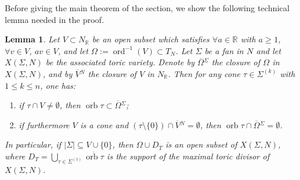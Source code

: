 \documentclass[JEP,XML,SOM,Unicode,NoFloatCountersInSection]{cedram}
\newenvironment{enumeratei}
{\bgroup\def\theenumi{\roman{enumi}}\def\theenumii{\arabic{enumii}}\begin{enumerate}}
{\end{enumerate}\egroup}
\newtheorem{lemma}[theorem]{Lemma}
\theoremstyle{definition}
\let\ov\overline
\let\sminus\setminus
\newcommand{\RR}{\mathbb{R}}
\DeclareMathOperator{\orb}{orb}
\DeclareMathOperator{\ord}{ord}
\begin{document}
Before giving the main theorem of the section, we show the following technical lemma needed in the proof.

\begin{lemma}\label{frontieraOmega}
Let $V\subset N_\RR$ be an open subset which satisfies $\forall a\in\RR$ with $a\geq 1$, $\forall v\in V$, $av\in V$, and let $\Omega:=\ord^{-1}(V)\subset T_N$. Let $\Sigma$ be a fan in $N$ and let $X(\Sigma,N)$ be the associated toric variety. Denote by $\ov\Omega{}^\Sigma$ the closure of $\Omega$ in $X(\Sigma, N)$, and by $\ov V{}^N$ the closure of $V$ in $N_\RR$. Then for any cone $\tau\in\Sigma^{(k)}$ with $1\leq k\leq n$, one has:
\begin{enumeratei}
\item\label{frontieraOmegai} if $\tau\cap V\neq\emptyset$, then $\orb\tau\subset\ov\Omega{}^\Sigma$;
\item\label{frontieraOmegaii} if furthermore $V$ is a cone and $(\tau\sminus\{0\})\cap\ov V{}^N=\emptyset$, then $\orb\tau\cap\ov\Omega{}^\Sigma =\emptyset$.
\end{enumeratei}
In particular, if $|\Sigma|\subseteq V\cup\{0\}$, then $\Omega\cup D_T$ is an open subset of $X(\Sigma, N)$, where $D_T=\bigcup_{\tau\in\Sigma^{(1)}}\ov{\orb\tau}$ is the support of the maximal toric divisor of $X(\Sigma,N)$.
\end{lemma}
\end{document}
